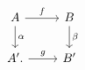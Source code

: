 \documentclass[12pt]{standalone}
\begin{document}
        $$

\begin{tikzcd}
    A \ar[r,"f"] \ar[d,"\alpha"] & B \ar[d,"\beta"] \\
    A^\prime. \ar[r,"g"] & B^\prime
\end{tikzcd}
        $$
        
\end{document}
